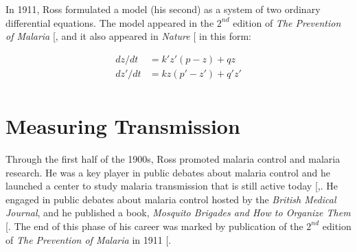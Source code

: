 \documentclass[
]{book}
\begin{document}
In 1911, Ross formulated a model (his second) as a system of two ordinary differential equations. The model appeared in the \(2^{nd}\) edition of \emph{The Prevention of Malaria} {[}\citeproc{ref-RossR1911Book}{1}{]}, and it also appeared in \emph{Nature} {[}\citeproc{ref-RossR1911Nature}{28}{]} in this form:

\[ 
\begin{array}{rl}
dz/dt &= k' z' (p-z) + q z \\
dz'/dt &= k z (p'-z') + q' z' \\
\end{array}
\]

\section{Measuring Transmission}\label{measuring-transmission}

Through the first half of the 1900s, Ross promoted malaria control and malaria research.
He was a key player in public debates about malaria control and he launched a center to study malaria transmission that is still active today {[},\citeproc{ref-BockarieMJ1999ItAll}{40}{]}.
He engaged in public debates about malaria control hosted by the \emph{British Medical Journal}, and he published a book, \emph{Mosquito Brigades and How to Organize Them} {[}\citeproc{ref-RossR1902MosquitoBrigades}{33}{]}.
The end of this phase of his career was marked by publication of the \(2^{nd}\) edition of \emph{The Prevention of Malaria} in 1911 {[}\citeproc{ref-RossR1911Book}{1}{]}.
\end{document}
